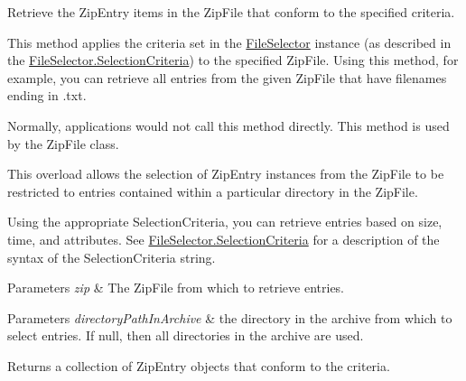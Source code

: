 Retrieve the Zip\+Entry items in the Zip\+File that conform to the specified criteria. 

This method applies the criteria set in the \mbox{\hyperlink{class_super_tiled2_unity_1_1_ionic_1_1_file_selector}{File\+Selector}} instance (as described in the \mbox{\hyperlink{class_super_tiled2_unity_1_1_ionic_1_1_file_selector_a0f2d26f8fb39862f504bc0069365ff39}{File\+Selector.\+Selection\+Criteria}}) to the specified Zip\+File. Using this method, for example, you can retrieve all entries from the given Zip\+File that have filenames ending in .txt. 

Normally, applications would not call this method directly. This method is used by the Zip\+File class. 

This overload allows the selection of Zip\+Entry instances from the Zip\+File to be restricted to entries contained within a particular directory in the Zip\+File. 

Using the appropriate Selection\+Criteria, you can retrieve entries based on size, time, and attributes. See \mbox{\hyperlink{class_super_tiled2_unity_1_1_ionic_1_1_file_selector_a0f2d26f8fb39862f504bc0069365ff39}{File\+Selector.\+Selection\+Criteria}} for a description of the syntax of the Selection\+Criteria string. 


\begin{DoxyParams}{Parameters}
{\em zip} & The Zip\+File from which to retrieve entries.\\
\hline
\end{DoxyParams}



\begin{DoxyParams}{Parameters}
{\em directory\+Path\+In\+Archive} & the directory in the archive from which to select entries. If null, then all directories in the archive are used. \\
\hline
\end{DoxyParams}


\begin{DoxyReturn}{Returns}
a collection of Zip\+Entry objects that conform to the criteria.
\end{DoxyReturn}
\mbox{\label{class_super_tiled2_unity_1_1_ionic_1_1_file_selector_a378ddfe137426330784a2561be3a5899}} 
